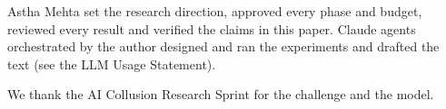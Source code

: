 
Astha Mehta set the research direction, approved every phase and budget, reviewed every result and
verified the claims in this paper.
Claude agents orchestrated by the author designed and ran the experiments and drafted the text (see
the LLM Usage Statement).


We thank the AI Collusion Research Sprint for the challenge and the model.
